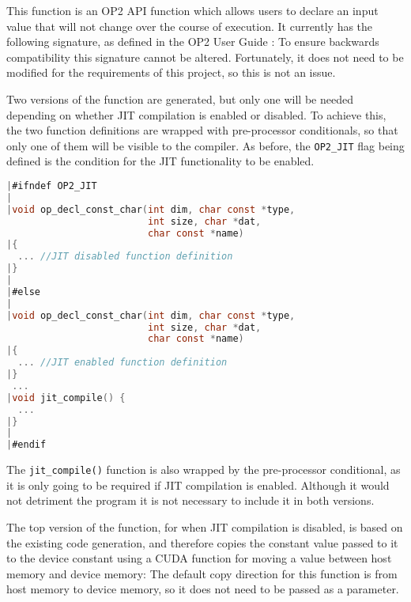 \clearpage
{}
This function is an OP2 API function which allows users to declare an input value that will not change over the course of execution. It currently has the following signature, as defined in the OP2 User Guide \cite[p9]{manual}:
To ensure backwards compatibility this signature cannot be altered. Fortunately, it does not need to be modified for the requirements of this project, so this is not an issue.
\par
Two versions of the function are generated, but only one will be needed depending on whether JIT compilation is enabled or disabled. To achieve this, the two function definitions are wrapped with pre-processor conditionals, so that only one of them will be visible to the compiler. As before, the \verb|OP2_JIT| flag being defined is the condition for the JIT functionality to be enabled.
\begin{lstlisting}[backgroundcolor=\color{red!20}, language=C]
|#ifndef OP2_JIT
|
|void op_decl_const_char(int dim, char const *type,
                         int size, char *dat,
                         char const *name)
|{
  ... //JIT disabled function definition
|}
|
|#else
|
|void op_decl_const_char(int dim, char const *type,
                         int size, char *dat,
                         char const *name)
|{
  ... //JIT enabled function definition
|}
 ...
|void jit_compile() {
  ...
|}
|
|#endif
\end{lstlisting}
The \verb|jit_compile()| function is also wrapped by the pre-processor conditional, as it is only going to be required if JIT compilation is enabled. Although it would not detriment the program it is not necessary to include it in both versions.

 The top version of the function, for when JIT compilation is disabled, is based on the existing code generation, and therefore copies the constant value passed to it to the device constant using a CUDA function for moving a value between host memory and device memory:
\noindent The default copy direction for this function is from host memory to device memory, so it does not need to be passed as a parameter.

